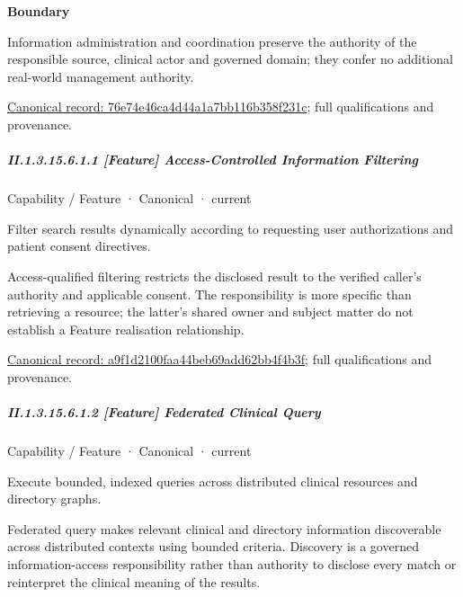 \textbf{Boundary}



Information administration and coordination preserve the authority of the responsible source, clinical actor and governed domain; they confer no additional real-world management authority.


{\footnotesize \href{../../../../continuum/strategy/capability/76e74e46ca4d44a1a7bb116b358f231c.md}{Canonical record: 76e74e46ca4d44a1a7bb116b358f231c}; full qualifications and provenance.}\par
\subparagraph*{II.1.3.15.6.1.1 [Feature] Access-Controlled Information Filtering}
\label{navigation:II.1.3.15.6.1.1}

\label{element:a9f1d2100faa44beb69add62bb4f4b3f}
{\small Capability / Feature · Canonical · current}\par

Filter search results dynamically according to requesting user authorizations and patient consent directives.



Access-qualified filtering restricts the disclosed result to the verified caller's authority and applicable consent. The responsibility is more specific than retrieving a resource; the latter's shared owner and subject matter do not establish a Feature realisation relationship.


{\footnotesize \href{../../../../continuum/strategy/capability/feature/a9f1d2100faa44beb69add62bb4f4b3f.md}{Canonical record: a9f1d2100faa44beb69add62bb4f4b3f}; full qualifications and provenance.}\par
\subparagraph*{II.1.3.15.6.1.2 [Feature] Federated Clinical Query}
\label{navigation:II.1.3.15.6.1.2}

\label{element:cfcc4d64af434418a567ccf46d8052dd}
{\small Capability / Feature · Canonical · current}\par

Execute bounded, indexed queries across distributed clinical resources and directory graphs.



Federated query makes relevant clinical and directory information discoverable across distributed contexts using bounded criteria. Discovery is a governed information-access responsibility rather than authority to disclose every match or reinterpret the clinical meaning of the results.


